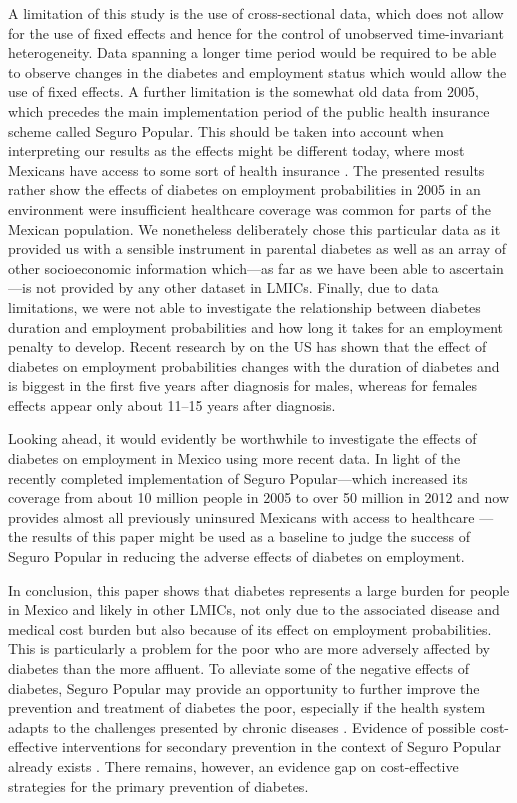 A limitation of this study is the use of cross-sectional
data, which does not allow for the use of fixed effects and hence
for the control of unobserved time-invariant heterogeneity. Data spanning
a longer time period would be required to be able
to observe changes in the diabetes and employment status which would
allow the use of fixed effects. A further limitation is the somewhat
old data from 2005, which precedes the main implementation period
of the public health insurance scheme called Seguro Popular. This
should be taken into account when interpreting our results as the
effects might be different today, where most Mexicans have access
to some sort of health insurance \parencite{Knaul2012}. The presented
results rather show the effects of diabetes on employment probabilities
in 2005 in an environment were insufficient healthcare coverage was
common for parts of the Mexican population. We nonetheless deliberately chose
this particular data \DIFaddbegin {}\DIFaddend as it provided us with a sensible instrument
in parental diabetes as well as an array of other socioeconomic information
which---as far as we have been able to ascertain---is not provided
by any other dataset in \acp{LMIC}. Finally, due to data limitations,
we were not able to investigate the relationship between diabetes
duration and employment probabilities and how long it takes for an employment
penalty to develop. Recent research by \textcite{Minor2013} on the US
has shown that the effect of diabetes on employment probabilities changes
with the duration of diabetes and is biggest in the first five years
after diagnosis for males, whereas for females \DIFdelbegin {}\DIFdelend effects appear
only about 11--15 years after diagnosis.

Looking ahead, it would evidently be worthwhile to investigate
the effects of diabetes on employment in Mexico using more recent
data. In light of the recently completed implementation of  Seguro
Popular---which increased its coverage from about 10 million people
in 2005 to over 50 million in 2012 and now provides almost all previously
uninsured Mexicans with access to healthcare \parencite{Knaul2012}---the results of this paper might be used as a baseline to judge the
success of Seguro Popular in reducing the adverse effects of diabetes
on employment.

In conclusion, this paper shows that diabetes represents
a large burden for people in Mexico and likely in other \acp{LMIC},
not only due to the associated disease and medical cost burden but
also because of its effect on employment probabilities. This is particularly
a problem for the poor who are more adversely affected by diabetes
than the more affluent. To alleviate some of the negative effects
of diabetes, Seguro Popular may provide an opportunity to further improve
the prevention and treatment of diabetes \DIFdelbegin {}\DIFdelend \DIFaddbegin {}\DIFaddend the poor, especially if
the health system adapts to the challenges presented by chronic diseases
\parencite{Samb2010}. Evidence of possible cost-effective interventions
for secondary prevention in the context of Seguro Popular already
exists \parencite{Salomon2012}. There remains, however, an evidence gap
on cost-effective strategies for the primary prevention of diabetes.

